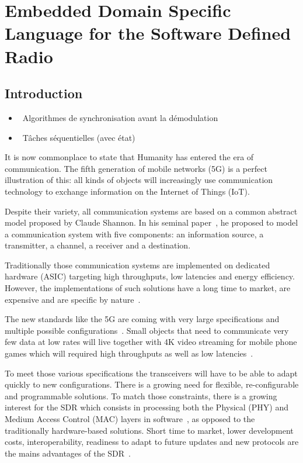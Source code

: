 
\graphicspath{{main/chapter6/fig/}}

\chapter{Embedded Domain Specific Language for the Software Defined Radio}

\minitoccustom

\section{Introduction}

\begin{itemize}
  \item \xmark~Algorithmes de synchronisation avant la démodulation
  \item \xmark~Tâches séquentielles (avec état)
\end{itemize}

It is now commonplace to state that Humanity has entered the era of
communication. The fifth generation of mobile networks (5G) is a perfect
illustration of this: all kinds of objects will increasingly use communication
technology to exchange information on the Internet of Things (IoT).

Despite their variety, all communication systems are based on a common
abstract model proposed by Claude Shannon. In his seminal
paper~\cite{Shannon1948}, he proposed to model a communication system with five
components: an information source, a transmitter, a channel, a receiver and a
destination.

Traditionally those communication systems are implemented on dedicated hardware
(ASIC) targeting high throughputs, low latencies and energy efficiency.
However, the implementations of such solutions have a long time to market, are
expensive and are specific by nature~\cite{Palkovic2010,Palkovic2012}.

The new standards like the 5G are coming with very large specifications and
multiple possible configurations~\cite{ETSI2018}. Small objects that need to
communicate very few data at low rates will live together with 4K video
streaming for mobile phone games which will required high throughputs as well as
low latencies~\cite{Rost2014}.

To meet those various specifications the transceivers will have to be able to
adapt quickly to new configurations. There is a growing need for flexible,
re-configurable and programmable solutions. To match those constraints, there is
a growing interest for the SDR which consists in processing both the Physical
(PHY) and Medium Access Control (MAC) layers in software~\cite{Mitola1993}, as
opposed to the traditionally hardware-based solutions. Short time to market,
lower development costs, interoperability, readiness to adapt to future updates
and new protocols are the mains advantages of the SDR~\cite{Akeela2018}.

